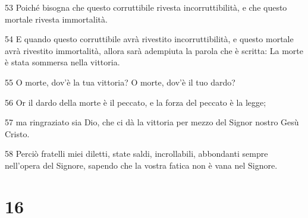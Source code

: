 \par 53 Poiché bisogna che questo corruttibile rivesta incorruttibilità, e che questo mortale rivesta immortalità.
\par 54 E quando questo corruttibile avrà rivestito incorruttibilità, e questo mortale avrà rivestito immortalità, allora sarà adempiuta la parola che è scritta: La morte è stata sommersa nella vittoria.
\par 55 O morte, dov'è la tua vittoria? O morte, dov'è il tuo dardo?
\par 56 Or il dardo della morte è il peccato, e la forza del peccato è la legge;
\par 57 ma ringraziato sia Dio, che ci dà la vittoria per mezzo del Signor nostro Gesù Cristo.
\par 58 Perciò fratelli miei diletti, state saldi, incrollabili, abbondanti sempre nell'opera del Signore, sapendo che la vostra fatica non è vana nel Signore.

\chapter{16}

